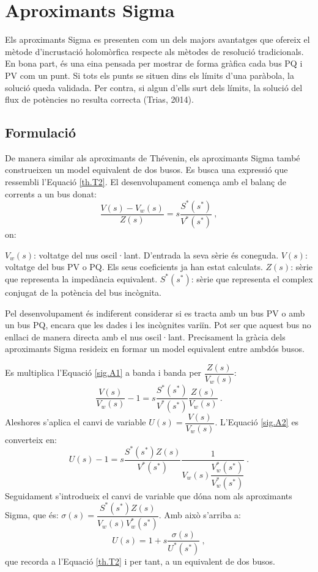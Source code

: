 \section{Aproximants Sigma}
Els aproximants Sigma es presenten com un dels majors avantatges que ofereix el mètode d'incrustació holomòrfica respecte als mètodes de resolució tradicionals. En bona part, és una eina pensada per mostrar de forma gràfica cada bus PQ i PV com un punt. Si tots els punts se situen dins els límits d'una paràbola, la solució queda validada. Per contra, si algun d'ells surt dels límits, la solució del flux de potències no resulta correcta (Trias, 2014).

\subsection{Formulació}
De manera similar als aproximants de Thévenin, els aproximants Sigma també construeixen un model equivalent de dos busos. Es busca una expressió que ressembli l'Equació \ref{th.T2}. El desenvolupament comença amb el balanç de corrents a un bus donat:
\begin{equation}
    \frac{V(s)-V_{w}(s)}{Z(s)}=s\frac{S^*(s^*)}{V^*(s^*)}\ ,
    \label{sig.A1}
\end{equation}
on:

$V_{w}(s)$: voltatge del nus oscil·lant. D'entrada la seva sèrie és coneguda.
\vs
$V(s)$: voltatge del bus PV o PQ. Els seus coeficients ja han estat calculats.
\vs
$Z(s)$: sèrie que representa la impedància equivalent.
\vs
$S^*(s^*)$: sèrie que representa el complex conjugat de la potència del bus incògnita.

Pel desenvolupament és indiferent considerar si es tracta amb un bus PV o amb un bus PQ, encara que les dades i les incògnites variïn. Pot ser que aquest bus no enllaci de manera directa amb el nus oscil·lant. Precisament la gràcia dels aproximants Sigma resideix en formar un model equivalent entre ambdós busos. 

Es multiplica l'Equació \ref{sig.A1} a banda i banda per $\dfrac{Z(s)}{V_{w}(s)}$:
\begin{equation}
    \frac{V(s)}{V_{w}(s)}-1=s\frac{S^*(s^*)}{V^*(s^*)}\frac{Z(s)}{V_{w}(s)}\ .
    \label{sig.A2}
\end{equation}
Aleshores s'aplica el canvi de variable $U(s)=\dfrac{V(s)}{V_{w}(s)}$. L'Equació \ref{sig.A2} es converteix en:
\begin{equation}
U(s)-1=s\frac{S^*(s^*)Z(s)}{V^*(s^*)}\frac{1}{V_{w}(s)\dfrac{V^*_{w}(s^*)}{V^*_{w}(s^*)}}\ .
\label{sig.A3}
\end{equation}
Seguidament s'introdueix el canvi de variable que dóna nom als aproximants Sigma, que és: $\sigma(s)=\dfrac{S^*(s^*)Z(s)}{V_{w}(s)V^*_w(s^*)}$. Amb això s'arriba a:
\begin{equation}
U(s)=1+s\frac{\sigma(s)}{U^*(s^*)}\ ,
\label{sig.A4}
\end{equation}
que recorda a l'Equació \ref{th.T2} i per tant, a un equivalent de dos busos.

